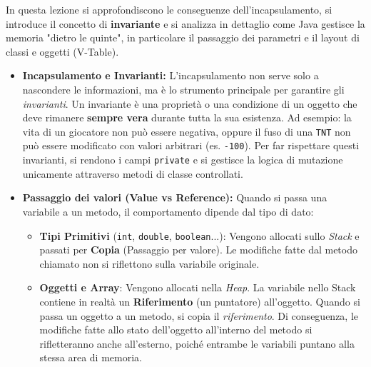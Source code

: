 \documentclass[12pt, a4paper]{article}
\begin{document}
In questa lezione si approfondiscono le conseguenze dell'incapsulamento, si introduce il concetto di \textbf{invariante} e si analizza in dettaglio come Java gestisce la memoria "dietro le quinte", in particolare il passaggio dei parametri e il layout di classi e oggetti (V-Table).

\begin{itemize}
    \item \textbf{Incapsulamento e Invarianti:} 
    L'incapsulamento non serve solo a nascondere le informazioni, ma è lo strumento principale per garantire gli \textit{invarianti}. Un invariante è una proprietà o una condizione di un oggetto che deve rimanere \textbf{sempre vera} durante tutta la sua esistenza. 
    Ad esempio: la vita di un giocatore non può essere negativa, oppure il fuso di una \texttt{TNT} non può essere modificato con valori arbitrari (es. \texttt{-100}). Per far rispettare questi invarianti, si rendono i campi \texttt{private} e si gestisce la logica di mutazione unicamente attraverso metodi di classe controllati.

    \item \textbf{Passaggio dei valori (Value vs Reference):}
    Quando si passa una variabile a un metodo, il comportamento dipende dal tipo di dato:
    \begin{itemize}
        \item \textbf{Tipi Primitivi} (\texttt{int}, \texttt{double}, \texttt{boolean}...): Vengono allocati sullo \textit{Stack} e passati per \textbf{Copia} (Passaggio per valore). Le modifiche fatte dal metodo chiamato non si riflettono sulla variabile originale.
        \item \textbf{Oggetti e Array}: Vengono allocati nella \textit{Heap}. La variabile nello Stack contiene in realtà un \textbf{Riferimento} (un puntatore) all'oggetto. Quando si passa un oggetto a un metodo, si copia il \textit{riferimento}. Di conseguenza, le modifiche fatte allo stato dell'oggetto all'interno del metodo si rifletteranno anche all'esterno, poiché entrambe le variabili puntano alla stessa area di memoria.
    \end{itemize}


\end{itemize}
\end{document}
